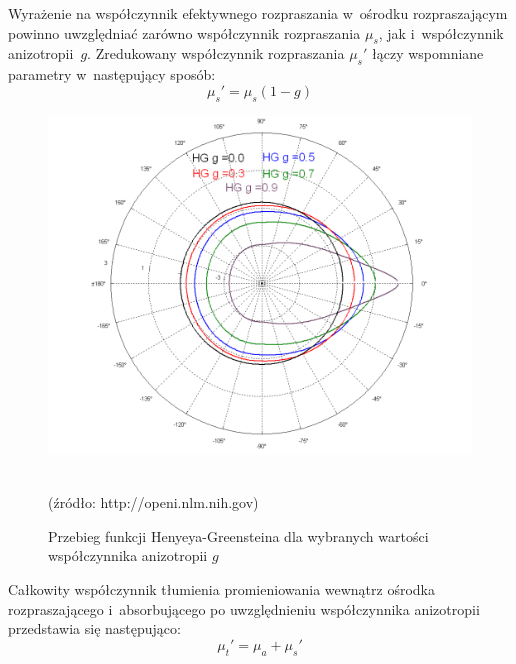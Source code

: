 Wyrażenie na współczynnik efektywnego rozpraszania w~ośrodku rozpraszającym powinno uwzględniać zarówno współczynnik rozpraszania $\mu_{s}$,
jak i~współczynnik anizotropii~$g$. 
\noindent Zredukowany współczynnik rozpraszania $\mu_{s}'$ łączy wspomniane parametry w~następujący sposób:
\begin{equation}
	\mu_{s}'=\mu_{s}(1-g)
	\label{equ:reduced_mu}
\end{equation}
\begin{figure}[ht]
	\centerline{\includegraphics[scale = 0.45]{graphic/HenyeyGreenstein.png}}
	\caption{Przebieg funkcji Henyeya-Greensteina dla wybranych wartości współczynnika anizotropii $g$}
	~\\
	(źródło: http://openi.nlm.nih.gov)
	\label{rys:anisotropy}
\end{figure}

\noindent Całkowity współczynnik tłumienia promieniowania wewnątrz ośrodka rozpraszającego i~absorbującego po uwzględnieniu współczynnika anizotropii przedstawia
się następująco:
\begin{equation}
	\mu_{t}'=\mu_{a} + \mu_{s}'
\end{equation}

